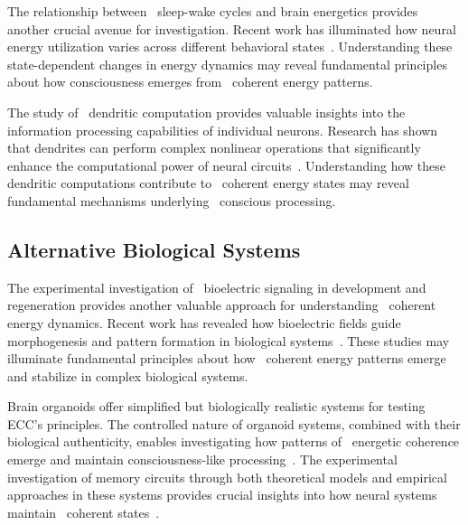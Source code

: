 The relationship between~ sleep-wake cycles and brain energetics provides another crucial avenue for investigation. Recent work has illuminated how neural energy utilization varies across different behavioral states~\cite{DiNuzzo2017}. Understanding these state-dependent changes in energy dynamics may reveal fundamental principles about how consciousness emerges from~ coherent energy patterns.

The study of~ dendritic computation provides valuable insights into the information processing capabilities of individual neurons. Research has shown that dendrites can perform complex nonlinear operations that significantly enhance the computational power of neural circuits~\cite{Gidon2020, London2005}. Understanding how these dendritic computations contribute to~ coherent energy states may reveal fundamental mechanisms underlying~ conscious processing.

\subsection*{Alternative Biological Systems}

The experimental investigation of~ bioelectric signaling in development and regeneration provides another valuable approach for understanding~ coherent energy dynamics. Recent work has revealed how bioelectric fields guide morphogenesis and pattern formation in biological systems~\cite{levin2020revisiting, Pietak2017}. These studies may illuminate fundamental principles about how~ coherent energy patterns emerge and stabilize in complex biological systems.

 Brain organoids offer simplified but biologically realistic systems for testing ECC's principles. The controlled nature of organoid systems, combined with their biological authenticity, enables investigating how patterns of~ energetic coherence emerge and maintain consciousness-like processing~\cite{Lancaster2013, Quadrato2017}. The experimental investigation of memory circuits through both theoretical models and empirical approaches in these systems provides crucial insights into how neural systems maintain~ coherent states~\cite{Lisman2018, gershman2023molecular}.

